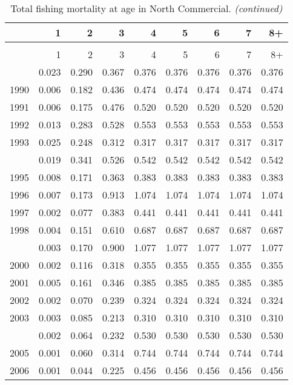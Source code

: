 \documentclass[
]{article}
\begin{document}
\begin{longtable}[t]{lrrrrrrrr}
\caption{\label{tab:North_Commercial-fleet-FAA-table}Total fishing mortality at age in North Commercial.}\\
\toprule
  & 1 & 2 & 3 & 4 & 5 & 6 & 7 & 8+\\
\midrule
\endfirsthead
\caption[]{Total fishing mortality at age in North Commercial. \textit{(continued)}}\\
\toprule
  & 1 & 2 & 3 & 4 & 5 & 6 & 7 & 8+\\
\midrule
\endhead

\endfoot
\bottomrule
\endlastfoot
1989 & 0.023 & 0.290 & 0.367 & 0.376 & 0.376 & 0.376 & 0.376 & 0.376\\
1990 & 0.006 & 0.182 & 0.436 & 0.474 & 0.474 & 0.474 & 0.474 & 0.474\\
1991 & 0.006 & 0.175 & 0.476 & 0.520 & 0.520 & 0.520 & 0.520 & 0.520\\
1992 & 0.013 & 0.283 & 0.528 & 0.553 & 0.553 & 0.553 & 0.553 & 0.553\\
1993 & 0.025 & 0.248 & 0.312 & 0.317 & 0.317 & 0.317 & 0.317 & 0.317\\
\addlinespace
1994 & 0.019 & 0.341 & 0.526 & 0.542 & 0.542 & 0.542 & 0.542 & 0.542\\
1995 & 0.008 & 0.171 & 0.363 & 0.383 & 0.383 & 0.383 & 0.383 & 0.383\\
1996 & 0.007 & 0.173 & 0.913 & 1.074 & 1.074 & 1.074 & 1.074 & 1.074\\
1997 & 0.002 & 0.077 & 0.383 & 0.441 & 0.441 & 0.441 & 0.441 & 0.441\\
1998 & 0.004 & 0.151 & 0.610 & 0.687 & 0.687 & 0.687 & 0.687 & 0.687\\
\addlinespace
1999 & 0.003 & 0.170 & 0.900 & 1.077 & 1.077 & 1.077 & 1.077 & 1.077\\
2000 & 0.002 & 0.116 & 0.318 & 0.355 & 0.355 & 0.355 & 0.355 & 0.355\\
2001 & 0.005 & 0.161 & 0.346 & 0.385 & 0.385 & 0.385 & 0.385 & 0.385\\
2002 & 0.002 & 0.070 & 0.239 & 0.324 & 0.324 & 0.324 & 0.324 & 0.324\\
2003 & 0.003 & 0.085 & 0.213 & 0.310 & 0.310 & 0.310 & 0.310 & 0.310\\
\addlinespace
2004 & 0.002 & 0.064 & 0.232 & 0.530 & 0.530 & 0.530 & 0.530 & 0.530\\
2005 & 0.001 & 0.060 & 0.314 & 0.744 & 0.744 & 0.744 & 0.744 & 0.744\\
2006 & 0.001 & 0.044 & 0.225 & 0.456 & 0.456 & 0.456 & 0.456 & 0.456\\

\end{longtable}
\end{document}

